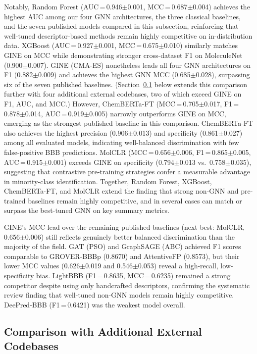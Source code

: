 \documentclass[conference]{IEEEtran}
\begin{document}
Notably, Random Forest (AUC\,=\,0.946$\pm$0.001, MCC\,=\,0.687$\pm$0.004) achieves the
highest AUC among our four GNN architectures, the three classical
baselines, and the seven published models compared in this subsection,
reinforcing that well-tuned descriptor-based methods remain highly
competitive on in-distribution data. XGBoost (AUC\,=\,0.927$\pm$0.001,
MCC\,=\,0.675$\pm$0.010) similarly matches GINE on MCC while demonstrating
stronger cross-dataset F1 on MoleculeNet (0.900$\pm$0.007). GINE (CMA-ES)
nonetheless leads all four GNN architectures on F1 (0.882$\pm$0.009) and
achieves the highest GNN MCC (0.685$\pm$0.028), surpassing six of the seven
published baselines. (Section~\ref{sec:additional_codebases_results}
below extends this comparison further with four additional external
codebases, two of which exceed GINE on F1, AUC, and MCC.) However,
ChemBERTa-FT (MCC\,=\,0.705$\pm$0.017, F1\,=\,0.878$\pm$0.014, AUC\,=\,0.919$\pm$0.005)
narrowly outperforms GINE on MCC, emerging as the strongest published
baseline in this comparison. ChemBERTa-FT also achieves
the highest precision (0.906$\pm$0.013) and specificity (0.861$\pm$0.027) among all
evaluated models, indicating well-balanced discrimination with few
false-positive BBB predictions. MolCLR (MCC\,=\,0.656$\pm$0.006, F1\,=\,0.865$\pm$0.005,
AUC\,=\,0.915$\pm$0.001) exceeds GINE on specificity (0.794$\pm$0.013 vs.\
0.758$\pm$0.035), suggesting
that contrastive pre-training strategies confer a measurable advantage
in minority-class identification. Together, Random Forest, XGBoost,
ChemBERTa-FT, and MolCLR extend the finding that strong non-GNN and
pre-trained baselines remain highly competitive, and in several cases
can match or surpass the best-tuned GNN on key summary metrics.

GINE's MCC lead over the remaining published baselines (next best:
MolCLR, 0.656$\pm$0.006) still reflects genuinely better balanced
discrimination than the majority of the field. GAT (PSO) and
GraphSAGE (ABC) achieved F1 scores comparable to GROVER-BBBp (0.8670)
and AttentiveFP (0.8573), but their lower MCC values (0.626$\pm$0.019 and
0.546$\pm$0.053) reveal a high-recall, low-specificity bias. LightBBB
(F1\,=\,0.8635, MCC\,=\,0.6235) remained a strong competitor despite
using only handcrafted descriptors, confirming the systematic review
finding that well-tuned non-GNN models remain highly competitive.
DeePred-BBB (F1\,=\,0.6421) was the weakest model overall.

\subsection{Comparison with Additional External Codebases}
\label{sec:additional_codebases_results}
\end{document}
